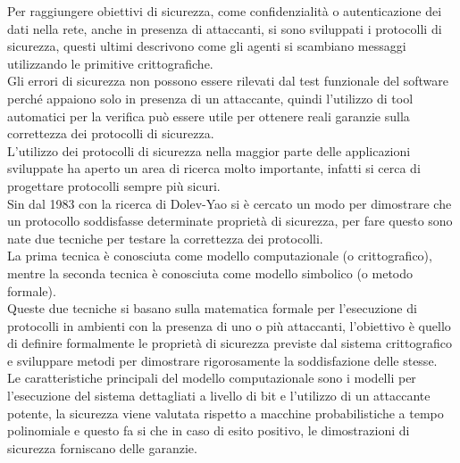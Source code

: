 
\noindent Per raggiungere obiettivi di sicurezza, come confidenzialità o autenticazione dei dati nella rete, anche in presenza di attaccanti, si sono sviluppati i protocolli di sicurezza, questi ultimi descrivono come gli agenti si scambiano messaggi utilizzando le primitive crittografiche.\\
Gli errori di sicurezza non possono essere rilevati dal test funzionale del software perché appaiono solo in presenza di un attaccante, quindi l'utilizzo di tool automatici per la verifica può essere utile per ottenere reali garanzie sulla correttezza dei protocolli di sicurezza.\\ 
L'utilizzo dei protocolli di sicurezza nella maggior parte delle applicazioni sviluppate ha aperto un area di ricerca molto importante, infatti si cerca di progettare protocolli sempre più sicuri.\\
Sin dal 1983 con la ricerca di Dolev-Yao si è cercato un modo per dimostrare che un protocollo soddisfasse determinate proprietà di sicurezza, per fare questo sono nate due tecniche per testare la correttezza dei protocolli.\\
La prima tecnica è conosciuta come modello computazionale (o crittografico), mentre la seconda tecnica è conosciuta come modello simbolico (o metodo formale).\\
Queste due tecniche si basano sulla matematica formale per l'esecuzione di protocolli in ambienti con la presenza di uno o più attaccanti, l'obiettivo è quello di definire formalmente le proprietà di sicurezza previste dal sistema crittografico e sviluppare metodi per dimostrare rigorosamente la soddisfazione delle stesse.\\
Le caratteristiche principali del modello computazionale sono i modelli per l'esecuzione del sistema dettagliati a livello di bit e l'utilizzo di un attaccante potente, la sicurezza viene valutata rispetto a macchine probabilistiche a tempo polinomiale e questo fa si che in caso di esito positivo, le dimostrazioni di sicurezza forniscano delle garanzie.\\
